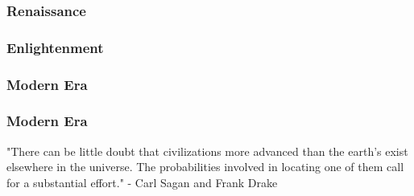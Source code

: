 \documentclass{beamer}
\begin{document}
\begin{frame}
\frametitle{Renaissance }
\end{frame}


\begin{frame}
\frametitle{Enlightenment}
\end{frame}


\begin{frame}
\frametitle{Modern Era}
\end{frame}

\begin{frame}
\frametitle{Modern Era}
"There can be little doubt that civilizations more advanced than the earth's
 exist elsewhere in the universe. The probabilities involved in locating one of them
 call for a substantial effort." - Carl Sagan and Frank Drake
\end{frame}
\end{document}
